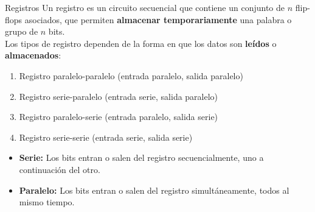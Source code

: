 \documentclass[aspectratio=169]{beamer}
\begin{document}
\begin{frame}[c]{Registros}
    Un registro es un circuito secuencial que contiene un conjunto de $n$ flip-flops asociados, que permiten \textbf{almacenar temporariamente} una palabra o grupo de $n$ bits.\\
    \vspace{0.2cm}
    \pause
    Los tipos de registro dependen de la forma en que los datos son \textbf{le\'idos} o \textbf{almacenados}:
    \vspace{0.2cm}
    \begin{enumerate}
    \item Registro \textcolor{naranjauca}{paralelo-paralelo} {\scriptsize (entrada paralelo, salida paralelo)}
    \item Registro \textcolor{naranjauca}{serie-paralelo} {\scriptsize (entrada serie, salida paralelo)}
    \item Registro \textcolor{naranjauca}{paralelo-serie} {\scriptsize (entrada paralelo, salida serie)}
    \item Registro \textcolor{naranjauca}{serie-serie} {\scriptsize (entrada serie, salida serie)}
    \end{enumerate}
    \bigskip
    \small
    \begin{itemize}
     \item[] \textbf{Serie:} \textcolor{verdeuca}{Los bits entran o salen del registro secuencialmente, uno a continuación del otro.}
     \item[] \textbf{Paralelo:} \textcolor{verdeuca}{Los bits entran o salen del registro simultáneamente, todos al mismo tiempo.}
    \end{itemize}
\end{frame}
\end{document}
